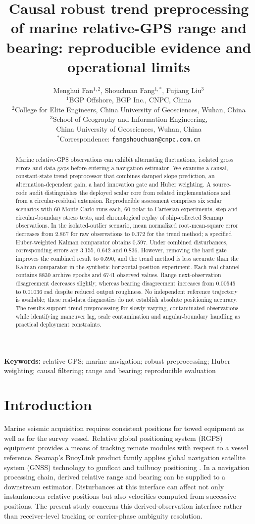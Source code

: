 \documentclass[12pt,a4paper]{article}
\title{Causal robust trend preprocessing of marine relative-GPS range and bearing: reproducible evidence and operational limits}
\author{}
\author{Menghui Fan$^{1,2}$, Shouchuan Fang$^{1,*}$, Fujiang Liu$^3$\\[0.5em]
\small $^1$BGP Offshore, BGP Inc., CNPC, China\\
\small $^2$College for Elite Engineers, China University of Geosciences, Wuhan, China\\
\small $^3$School of Geography and Information Engineering,\\
\small China University of Geosciences, Wuhan, China\\
\small $^*$Correspondence: \texttt{fangshouchuan@cnpc.com.cn}}
\date{}
\begin{document}
\maketitle
\vspace{-2em}
\linenumbers
\begin{abstract}
Marine relative-GPS observations can exhibit alternating fluctuations, isolated gross errors and data gaps before entering a navigation estimator. We examine a causal, constant-state trend preprocessor that combines damped slope prediction, an alternation-dependent gain, a hard innovation gate and Huber weighting. A source-code audit distinguishes the deployed scalar core from related implementations and from a circular-residual extension. Reproducible assessment comprises six scalar scenarios with 60 Monte Carlo runs each, 60 polar-to-Cartesian experiments, step and circular-boundary stress tests, and chronological replay of ship-collected Seamap observations. In the isolated-outlier scenario, mean normalized root-mean-square error decreases from 2.867 for raw observations to 0.372 for the trend method; a specified Huber-weighted Kalman comparator obtains 0.597. Under combined disturbances, corresponding errors are 3.155, 0.642 and 0.836. However, removing the hard gate improves the combined result to 0.590, and the trend method is less accurate than the Kalman comparator in the synthetic horizontal-position experiment. Each real channel contains 8830 archive epochs and 6741 observed values. Range next-observation disagreement decreases slightly, whereas bearing disagreement increases from 0.00545 to 0.01036 rad despite reduced output roughness. No independent reference trajectory is available; these real-data diagnostics do not establish absolute positioning accuracy. The results support trend preprocessing for slowly varying, contaminated observations while identifying maneuver lag, scale contamination and angular-boundary handling as practical deployment constraints.
\end{abstract}
\noindent\textbf{Keywords:} relative GPS; marine navigation; robust preprocessing; Huber weighting; causal filtering; range and bearing; reproducible evaluation

\section{Introduction}
Marine seismic acquisition requires consistent positions for towed equipment as well as for the survey vessel. Relative global positioning system (RGPS) equipment provides a means of tracking remote modules with respect to a vessel reference. Seamap's BuoyLink product family applies global navigation satellite system (GNSS) technology to gunfloat and tailbuoy positioning \cite{seamap}. In a navigation processing chain, derived relative range and bearing can be supplied to a downstream estimator. Disturbances at this interface can affect not only instantaneous relative positions but also velocities computed from successive positions. The present study concerns this derived-observation interface rather than receiver-level tracking or carrier-phase ambiguity resolution.
\end{document}
